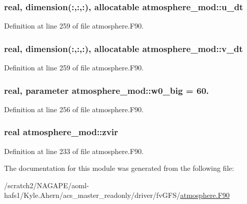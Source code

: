 \subsubsection[{u\-\_\-dt}]{\setlength{\rightskip}{0pt plus 5cm}real, dimension(\-:,\-:,\-:), allocatable atmosphere\-\_\-mod\-::u\-\_\-dt\hspace{0.3cm}{\ttfamily [private]}}\label{classatmosphere__mod_a9f0ef35864e057ad8b3b0d5b644cff55}


Definition at line 259 of file atmosphere.\-F90.

\subsubsection[{v\-\_\-dt}]{\setlength{\rightskip}{0pt plus 5cm}real, dimension(\-:,\-:,\-:), allocatable atmosphere\-\_\-mod\-::v\-\_\-dt\hspace{0.3cm}{\ttfamily [private]}}\label{classatmosphere__mod_a8245233dc81e751888853150262e6489}


Definition at line 259 of file atmosphere.\-F90.

\subsubsection[{w0\-\_\-big}]{\setlength{\rightskip}{0pt plus 5cm}real, parameter atmosphere\-\_\-mod\-::w0\-\_\-big = 60.\hspace{0.3cm}{\ttfamily [private]}}\label{classatmosphere__mod_ac2c4834fc822689255bc707f8405fed1}


Definition at line 256 of file atmosphere.\-F90.

\subsubsection[{zvir}]{\setlength{\rightskip}{0pt plus 5cm}real atmosphere\-\_\-mod\-::zvir\hspace{0.3cm}{\ttfamily [private]}}\label{classatmosphere__mod_a313b4e35ea4020ee6ce916400b716e81}


Definition at line 233 of file atmosphere.\-F90.



The documentation for this module was generated from the following file\-:\begin{DoxyCompactItemize}
\item 
/scratch2/\-N\-A\-G\-A\-P\-E/aoml-\/hafs1/\-Kyle.\-Ahern/acs\-\_\-master\-\_\-readonly/driver/fv\-G\-F\-S/\hyperlink{atmosphere_8F90}{atmosphere.\-F90}\end{DoxyCompactItemize}
